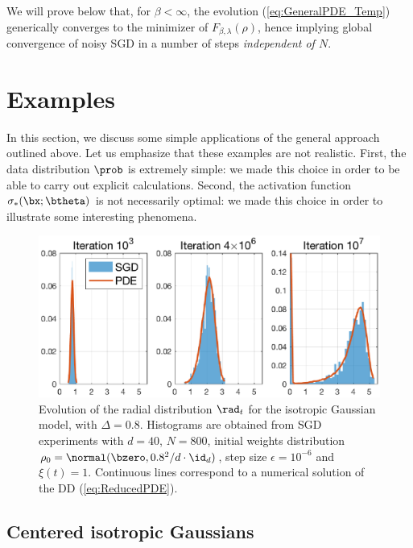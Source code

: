 \documentclass[11pt]{article}
\renewcommand{\eqref}[1]{(\ref{#1})}
\begin{document}
We will prove below that, for $\beta<\infty$, the evolution \eqref{eq:GeneralPDE_Temp} generically converges to the minimizer of
$F_{\beta, \lambda}(\rho)$, hence implying global convergence of noisy SGD in a number of steps \emph{independent of $N$}.

\section{Examples}
\label{sec:Examples}

In this section, we discuss some simple applications of the general approach outlined 
above. Let us emphasize that  these examples are not realistic. First, the data distribution $\prob$ is extremely simple: we made 
this choice in order to be able to carry out explicit calculations. Second, the activation function $\sigma_*(\bx;\btheta)$
is not necessarily optimal: we made this choice in order to illustrate some interesting phenomena.


%
\begin{figure}[ht!]
\centering
\includegraphics[width=0.9\linewidth]{isoPDE_flatSigmoid_rhist_Delta8_step10_initW8.eps}
\caption{Evolution of the radial distribution $\rad_t$ for the  isotropic Gaussian model, with $\Delta=0.8$.
Histograms are obtained from SGD experiments with $d=40$, $N=800$, initial weights distribution $\rho_0 =  \normal(\bzero,0.8^2/d\cdot\id_d)$, step size $\epsilon=10^{-6}$ and $\xi(t) = 1$. Continuous lines correspond to a numerical solution of the  DD \eqref{eq:ReducedPDE}.
\label{fig:SGD_Spherically}}
\end{figure}
%

\subsection{Centered isotropic Gaussians}
\end{document}
